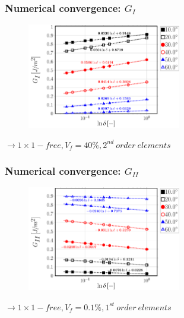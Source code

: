 \documentclass[first,firstsupp,lastsupp,last,hyperref,table]{ETHclass}
\begin{document}
\begin{frame}
\frametitle{\vspace{0.25cm}\small Numerical convergence: $G_{I}$}
\vspace{-.75cm}
\centering
\begin{figure}
\centering
\includegraphics[width=0.6\textwidth]{Vf40-free-2nd-semilogvsDelta-GI.pdf}
\end{figure}
$\rightarrow 1\times1-free, V_{f}=40\%, 2^{nd}\ order\ elements$ 
\end{frame}

\begin{frame}
\frametitle{\vspace{0.25cm}\small Numerical convergence: $G_{II}$}
\vspace{-.75cm}
\centering
\begin{figure}
\centering
\includegraphics[width=0.6\textwidth]{Vf0_1-free-1st-semilogvsDelta-GII.pdf}
\end{figure}
$\rightarrow 1\times1-free, V_{f}=0.1\%, 1^{st}\ order\ elements$ 
\end{frame}

\addtocounter{framenumber}{-1}
\end{document}
